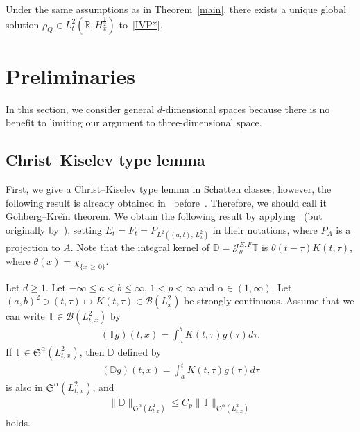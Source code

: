 \documentclass[10pt,a4paper]{amsart}
\newcommand{\BD}{\mathbb{D}}
\newcommand{\BR}{\mathbb{R}}
\newcommand{\BT}{\mathbb{T}}
\newcommand{\CB}{\mathcal{B}}
\newcommand{\CJ}{\mathcal{J}}
\newcommand{\FS}{\mathfrak{S}}
\newcommand{\al}{\alpha}
\newcommand{\ta}{\tau}
\renewcommand{\th}{\theta}
\newcommand{\rh}{\rho}
\newcommand{\ch}{\chi}
\newcommand{\I}{\infty}
\newcommand{\tx}{{t,x}}
\newcommand{\tw}{\frac{1}{2}}
\begin{document}
\begin{theo} \label{den main}
Under the same assumptions as in Theorem~\ref{main}, there exists a unique global solution $\rh_Q \in L^2_t(\BR,H^\tw_x)$ to~\eqref{IVP*}.
\end{theo}



\section{Preliminaries}\label{sect3}

In this section, we consider general $d$-dimensional spaces because there is no benefit to limiting our argument to three-dimensional space.

\subsection{Christ--Kiselev type lemma} 

First, we give a Christ--Kiselev type lemma in Schatten classes; however, the following result is already obtained in~\cite{1970Go-Kre} before~\cite{2001CK}. Therefore, we should call it Gohberg--Kre\u{\i}n theorem. We obtain the following result by applying~\cite[Theorem~7.2]{2003BS} (but originally by~\cite[Theorem~III.6.2]{1970Go-Kre}), setting $E_t = F_t = P_{L^2((a,t);\,L^2_x)}$ in their notations, where $P_A$ is a projection to $A$. Note that the integral kernel of $\BD = \CJ^{E,F}_\th \BT$ is $\th(t-\ta)K(t,\ta)$, where $\th(x)=\ch_{\{x \,\ge\,0\}}$.

\begin{theo} \label{SCK}
Let $d \ge 1$. Let $-\I \leq a < b \leq \I$, $1 < p < \I$ and $\al \in (1,\I)$. Let $(a,b)^2 \ni (t,\ta) \mapsto K(t,\ta)\in \CB(L^2_x)$ be strongly continuous. Assume that we can write $\BT \in \CB(L^2_\tx)$ by
\begin{align}
(\BT g)(t,x) = \int_a^b K(t,\ta)g(\ta)d\ta.
\end{align}
If $\BT \in \FS^\al(L^2_\tx)$, then $\BD$ defined by
\begin{align}
(\BD g)(t,x) = \int_a^t K(t,\ta)g(\ta)d\ta
\end{align}
is also in $\FS^\al(L^2_\tx)$, and
\begin{align}
\|\BD\|_{\FS^\al\left(L^2_\tx\right)} \le C_p \|\BT\|_{\FS^\al\left(L^2_\tx\right)}
\end{align}
holds.
\end{theo}
\end{document}
